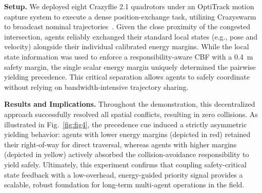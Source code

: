 \textbf{Setup.} We deployed eight Crazyflie 2.1 quadrotors under an OptiTrack motion capture system to execute a dense position-exchange task, utilizing Crazyswarm to broadcast nominal trajectories~\cite{preiss2017crazyswarm}.
Given the close proximity of the congested intersection, agents reliably exchanged their standard local states (e.g., pose and velocity) alongside their individual calibrated energy margins. 
While the local state information was used to enforce a responsibility-aware CBF with a 0.4~m safety margin, the single scalar energy margin uniquely determined the pairwise yielding precedence. 
This critical separation allows agents to safely coordinate without relying on bandwidth-intensive trajectory sharing.

\textbf{Results and Implications.} Throughout the demonstration, this decentralized approach successfully resolved all spatial conflicts, resulting in zero collisions. 
As illustrated in Fig.~\ref{fig:fig4}, the precedence cue induced a strictly asymmetric yielding behavior: agents with lower energy margins (depicted in red) retained their right-of-way for direct traversal, whereas agents with higher margins (depicted in yellow) actively absorbed the collision-avoidance responsibility to yield safely. 
Ultimately, this experiment confirms that coupling safety-critical state feedback with a low-overhead, energy-guided priority signal provides a scalable, robust foundation for long-term multi-agent operations in the field.